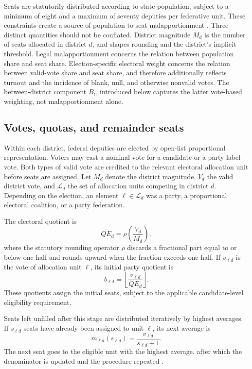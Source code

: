 \documentclass[11pt]{article}
\begin{document}
Seats are statutorily distributed according to state population, subject to a
minimum of eight and a maximum of seventy deputies per federative unit.
These constraints create a source of population-to-seat malapportionment
\parencite{samuelsSnyder2001value}. Three distinct quantities should not be
conflated. District magnitude \(M_d\) is the number of seats allocated in
district \(d\), and shapes rounding and the district's implicit threshold.
Legal malapportionment concerns the relation between population share and
seat share. Election-specific electoral weight concerns the relation between
valid-vote share and seat share, and therefore additionally reflects turnout
and the incidence of blank, null, and otherwise nonvalid votes. The
between-district component \(B_C\) introduced below captures the latter
vote-based weighting, not malapportionment alone.

\subsection{Votes, quotas, and remainder seats}

Within each district, federal deputies are elected by open-list proportional
representation. Voters may cast a nominal vote for a candidate or a
party-label vote. Both types of valid vote are credited to the relevant
electoral allocation unit before seats are assigned. Let \(M_d\) denote the
district magnitude, \(V_d\) the valid district vote, and
\(\mathcal{L}_d\) the set of allocation units competing in district \(d\).
Depending on the election, an element \(\ell\in\mathcal{L}_d\) was a party,
a proportional electoral coalition, or a party federation.

The electoral quotient is
\[
QE_d=\rho\left(\frac{V_d}{M_d}\right),
\]
where the statutory rounding operator \(\rho\) discards a fractional part
equal to or below one half and rounds upward when the fraction exceeds one
half. If \(v_{\ell d}\) is the vote of allocation unit \(\ell\), its initial
party quotient is
\[
b_{\ell d}
=
\left\lfloor
\frac{v_{\ell d}}{QE_d}
\right\rfloor .
\]
These quotients assign the initial seats, subject to the applicable
candidate-level eligibility requirement.

Seats left unfilled after this stage are distributed iteratively by highest
averages. If \(s_{\ell d}\) seats have already been assigned to unit \(\ell\),
its next average is
\[
m_{\ell d}(s_{\ell d})
=
\frac{v_{\ell d}}{s_{\ell d}+1}.
\]
The next seat goes to the eligible unit with the highest average, after which
the denominator is updated and the procedure repeated
\parencite[arts.~106--109]{codigoEleitoral1965}.
\end{document}
